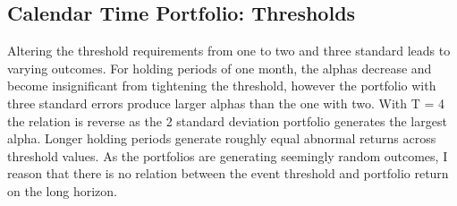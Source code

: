 \setlength{\tabcolsep}{15pt}
\begin{table}[H]
\small
\centering
\caption{FF-5 alpha with equal weights and edit event rule } 
\label{tab: FF5_sensitivity}
\end{table}

\subsection{Calendar Time Portfolio: Thresholds}

Altering the threshold requirements from one to two and three standard leads to varying outcomes. For holding periods of one month, the alphas decrease and become insignificant from tightening the threshold, however the portfolio with three standard errors produce larger alphas than the one with two. With T = 4 the relation is reverse as the 2 standard deviation portfolio generates the largest alpha. Longer holding periods generate roughly equal abnormal returns across threshold values. As the portfolios are generating seemingly random outcomes, I reason that there is no relation between the event threshold and portfolio return on the long horizon. 
